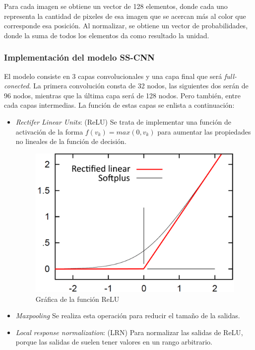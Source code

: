 \documentclass[14pt,a4paper]{report}
\begin{document}
Para cada imagen se obtiene un vector de 128 elementos, donde cada uno representa la cantidad de pixeles de esa imagen que se acercan más al color que corresponde esa posición. Al normalizar, se obtiene un vector de probabilidades, donde la suma de todos los elementos da como resultado la unidad.

\subsubsection{Implementación del modelo SS-CNN}

El modelo consiste en 3 capas convolucionales y una capa final que será \textit{full-conected}. La primera convolución consta de 32 nodos, las siguientes dos serán de 96 nodos, mientras que la última capa será de 128 nodos. Pero también, entre cada capas intermedias. La función de estas capas se enlista a continuación:
\begin{itemize}
\item \textit{Rectifer Linear Units}: (ReLU) Se trata de implementar una función de activación de la forma $f(v_k) = max(0, v_k)$ para aumentar las propiedades no lineales de la función de decisión.

\begin{figure}[h]
  \centering
\includegraphics[scale=0.6]{../relu.png} 
  \caption{Gráfica de la función ReLU}
  \label{fig:neural-network}
\end{figure}

\item \textit{Maxpooling} Se realiza esta operación para reducir el tamaño de la salidas.
\item \textit{Local response normalization}: (LRN) Para normalizar las salidas de ReLU, porque las salidas de suelen tener valores en un rango arbitrario.
\end{itemize}
\end{document}
